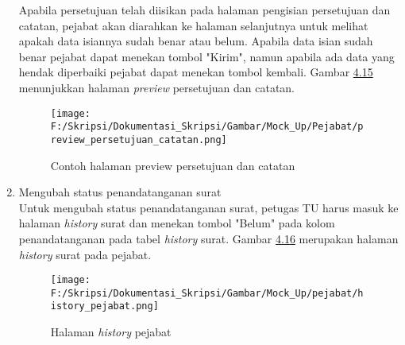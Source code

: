 \begin{enumerate}
	Apabila persetujuan telah diisikan pada halaman pengisian persetujuan dan catatan, pejabat akan diarahkan ke halaman selanjutnya untuk melihat apakah data isiannya sudah benar atau belum. Apabila data isian sudah benar pejabat dapat menekan tombol "Kirim", namun apabila ada data yang hendak diperbaiki pejabat dapat menekan tombol kembali. Gambar \hyperlink{halaman_preview_persetujuan_dan_catatan}{4.15} menunjukkan halaman \textit{preview} persetujuan dan catatan.
	\begin{figure}[H]
	\centering
		\texttt{[image: F:/Skripsi/Dokumentasi\_Skripsi/Gambar/Mock\_Up/Pejabat/preview\_persetujuan\_catatan.png]}
		\caption{Contoh halaman preview persetujuan dan catatan}
		\label{fig:halaman_preview_persetujuan_dan_catatan}
	\end{figure}
	
	\item Mengubah status penandatanganan surat \\
	Untuk mengubah status penandatanganan surat, petugas TU harus masuk ke halaman \textit{history} surat dan menekan tombol "Belum" pada kolom penandatanganan pada tabel \textit{history} surat. Gambar \hyperlink{halaman_history_pejabat}{4.16} merupakan halaman \textit{history} surat pada pejabat.
	\begin{figure}[H]
	\centering
		\texttt{[image: F:/Skripsi/Dokumentasi\_Skripsi/Gambar/Mock\_Up/pejabat/history\_pejabat.png]}
		\caption{Halaman \textit{history} pejabat}
		\label{fig:halaman_history_pejabat}
	\end{figure}
\end{enumerate}

